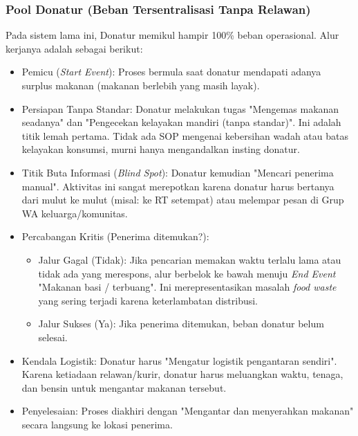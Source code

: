 \subsubsection{Pool Donatur (Beban Tersentralisasi Tanpa Relawan)}
Pada sistem lama ini, Donatur memikul hampir 100\% beban operasional. Alur kerjanya adalah sebagai berikut:
\begin{itemize}
    \item Pemicu (\textit{Start Event}): Proses bermula saat donatur mendapati adanya surplus makanan (makanan berlebih yang masih layak).
    \item Persiapan Tanpa Standar: Donatur melakukan tugas "Mengemas makanan seadanya" dan "Pengecekan kelayakan mandiri (tanpa standar)". Ini adalah titik lemah pertama. Tidak ada SOP mengenai kebersihan wadah atau batas kelayakan konsumsi, murni hanya mengandalkan insting donatur.
    \item Titik Buta Informasi (\textit{Blind Spot}): Donatur kemudian "Mencari penerima manual". Aktivitas ini sangat merepotkan karena donatur harus bertanya dari mulut ke mulut (misal: ke RT setempat) atau melempar pesan di Grup WA keluarga/komunitas.
    \item Percabangan Kritis (Penerima ditemukan?):
    \begin{itemize}
        \item Jalur Gagal (Tidak): Jika pencarian memakan waktu terlalu lama atau tidak ada yang merespons, alur berbelok ke bawah menuju \textit{End Event} "Makanan basi / terbuang". Ini merepresentasikan masalah \textit{food waste} yang sering terjadi karena keterlambatan distribusi.
        \item Jalur Sukses (Ya): Jika penerima ditemukan, beban donatur belum selesai.
    \end{itemize}
    \item Kendala Logistik: Donatur harus "Mengatur logistik pengantaran sendiri". Karena ketiadaan relawan/kurir, donatur harus meluangkan waktu, tenaga, dan bensin untuk mengantar makanan tersebut.
    \item Penyelesaian: Proses diakhiri dengan "Mengantar dan menyerahkan makanan" secara langsung ke lokasi penerima.
\end{itemize}

